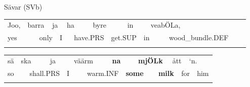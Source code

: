 \begin{listWWNumileveli}
\item 

\begin{styleExample}
Sävar (SVb)

\end{styleExample}

\end{listWWNumileveli}

\begin{tabular}{llllllllllllllll}
\lsptoprule
Joo, & \multicolumn{2}{l}{barra

} & \multicolumn{2}{l}{ja

} & \multicolumn{2}{l}{ha

} & \multicolumn{2}{l}{byre

} & \multicolumn{2}{l}{in

} & \multicolumn{2}{l}{veabÖLa,

} & \multicolumn{2}{l}{} & \\
\multicolumn{2}{l}{yes

} & \multicolumn{2}{l}{only

} & \multicolumn{2}{l}{I

} & \multicolumn{2}{l}{have.PRS

} & \multicolumn{2}{l}{get.SUP

} & \multicolumn{2}{l}{in

} & \multicolumn{2}{l}{wood\_bundle.DEF

} & \multicolumn{2}{l}{}\\
\lspbottomrule
\end{tabular}

\begin{tabular}{llllllllllllllll}
\lsptoprule
sä & \multicolumn{2}{l}{ska

} & \multicolumn{2}{l}{ja

} & \multicolumn{2}{l}{väärm

} & \multicolumn{2}{l}{{\bfseries na}

} & \multicolumn{2}{l}{{\bfseries mjÖLk}

} & \multicolumn{2}{l}{ått

} & \multicolumn{2}{l}{‘n.

} & \\
\multicolumn{2}{l}{so

} & \multicolumn{2}{l}{shall.PRS

} & \multicolumn{2}{l}{I

} & \multicolumn{2}{l}{warm.INF

} & \multicolumn{2}{l}{{\bfseries some}

} & \multicolumn{2}{l}{{\bfseries milk}

} & \multicolumn{2}{l}{for 

} & \multicolumn{2}{l}{him

}\\
\lspbottomrule
\end{tabular}

